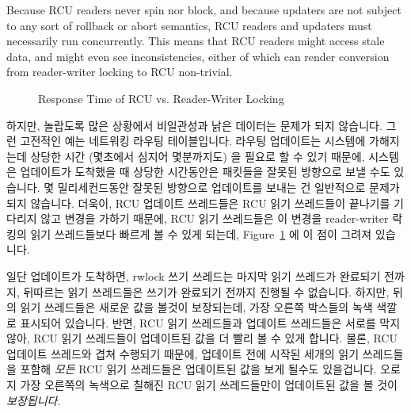 Because RCU readers never spin nor block, and because updaters are not
subject to any sort of rollback or abort semantics, RCU readers and
updaters must necessarily run concurrently.
This means that RCU readers might access stale data, and might even
see inconsistencies, either of which can render conversion from reader-writer
locking to RCU non-trivial.
\fi

\begin{figure}[tb]
\begin{center}
\end{center}
\caption{Response Time of RCU vs. Reader-Writer Locking}
\label{fig:defer:Response Time of RCU vs. Reader-Writer Locking}
\end{figure}

하지만, 놀랍도록 많은 상황에서 비일관성과 낡은 데이터는 문제가 되지 않습니다.
그런 고전적인 예는 네트워킹 라우팅 테이블입니다.
라우팅 업데이트는 시스템에 가해지는데 상당한 시간 (몇초에서 심지어 몇분까지도)
을 필요로 할 수 있기 때문에, 시스템은 업데이트가 도착했을 때 상당한 시간동안은
패킷들을 잘못된 방향으로 보낼 수도 있습니다.
몇 밀리세컨드동안 잘못된 방향으로 업데이트를 보내는 건 일반적으로 문제가 되지
않습니다.
더욱이, RCU 업데이트 쓰레드들은 RCU 읽기 쓰레드들이 끝나기를 기다리지 않고
변경을 가하기 때문에, RCU 읽기 쓰레드들은 이 변경을 reader-writer 락킹의 읽기
쓰레드들보다 빠르게 볼 수 있게 되는데,
Figure~\ref{fig:defer:Response Time of RCU vs. Reader-Writer Locking} 에 이
점이 그려져 있습니다.

일단 업데이트가 도착하면, rwlock 쓰기 쓰레드는 마지막 읽기 쓰레드가 완료되기
전까지, 뒤따르는 읽기 쓰레드들은 쓰기가 완료되기 전까지 진행될
수 없습니다.
하지만, 뒤의 읽기 쓰레드들은 새로운 값을 볼것이 보장되는데, 가장 오른쪽
박스들의 녹색 색깔로 표시되어 있습니다.
반면, RCU 읽기 쓰레드들과 업데이트 쓰레드들은 서로를 막지 않아, RCU 읽기
쓰레드들이 업데이트된 값을 더 빨리 볼 수 있게 합니다.
물론, RCU 업데이트 쓰레드와 겹쳐 수행되기 때문에, 업데이트 전에 시작된 세개의
읽기 쓰레드들을 포함해 \emph{모든} RCU 읽기 쓰레드들은 업데이트된 값을 보게
될수도 있을겁니다.
오로지 가장 오른쪽의 녹색으로 칠해진 RCU 읽기 쓰레드들만이 업데이트된 값을 볼
것이 \emph{보장됩니다}.
\iffalse

